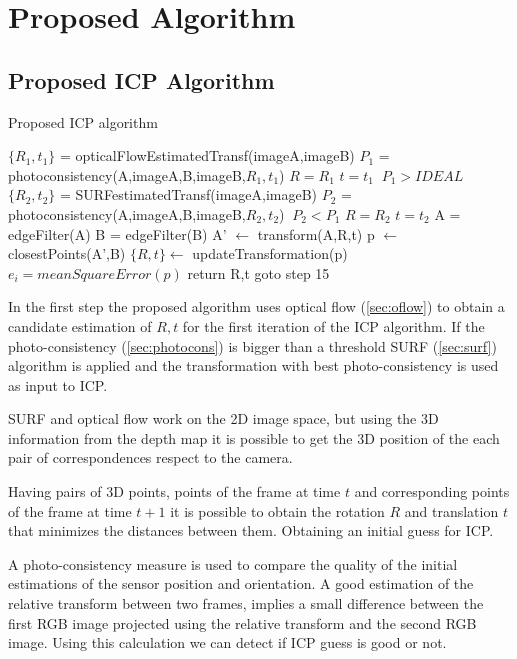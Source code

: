 \section{Proposed Algorithm}

\subsection{Proposed ICP Algorithm}

\begin{algorithm}
\caption{Proposed ICP algorithm}
\begin{algorithmic}[1]
\State $\{R_1,t_1\}$ = opticalFlowEstimatedTransf(imageA,imageB)
\State $P_1$ = photoconsistency(A,imageA,B,imageB,$R_1,t_1$)
\State $R=R_1$
\State $t=t_1$
\If $\ P_1 > IDEAL$
    \State $\{R_2,t_2\}$ = SURFestimatedTransf(imageA,imageB)
    \State  $P_2$ = photoconsistency(A,imageA,B,imageB,$R_2,t_2$)
    \If $\ P_2 < P_1$
        \State $R=R_2$
        \State $t=t_2$
    \EndIf
\EndIf
\State A = edgeFilter(A)
\State B = edgeFilter(B)
\State A' $\leftarrow$ transform(A,R,t) 
\State p $\leftarrow$ closestPoints(A',B)
\State $\{R,t\} \gets$ updateTransformation(p)
\State $e_i = meanSquareError(p)$
	\State return R,t
\Else
	\State goto step 15
\EndIf
\end{algorithmic}
\end{algorithm}


In the first step the proposed algorithm uses optical flow (\ref{sec:oflow}) to obtain a candidate estimation of 
$R,t$ for the first iteration of the ICP algorithm. If the photo-consistency (\ref{sec:photocons}) is bigger than a threshold 
SURF (\ref{sec:surf}) algorithm is applied and the transformation with best photo-consistency is used as input to ICP.

SURF and optical flow work on the 2D image space, but using 
the 3D information from the depth map it is possible to get the 3D position 
of the each pair of correspondences respect to the camera. 

Having pairs of 3D points, points of the frame at time $t$ and corresponding points 
of the frame at time $t + 1$ it is possible to obtain the rotation $R$ and translation $t$
 that minimizes the distances between them. Obtaining an initial guess 
 for ICP. 

A photo-consistency measure is used to compare the quality of the initial estimations of the sensor
 position and orientation. A good estimation of the relative transform between two frames, implies 
a small difference between the first RGB image projected using the relative transform and the second RGB 
image. Using this calculation we can detect if ICP guess is good or not.


